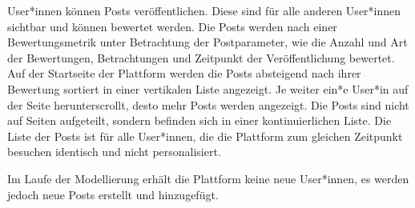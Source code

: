 User*innen können Posts veröffentlichen. Diese sind für alle anderen User*innen sichtbar und können bewertet werden. Die Posts werden nach einer Bewertungsmetrik unter Betrachtung der Postparameter, wie die Anzahl und Art der Bewertungen, Betrachtungen und Zeitpunkt der Veröffentlichung bewertet. Auf der Startseite der Plattform werden die Posts absteigend nach ihrer Bewertung sortiert in einer vertikalen Liste angezeigt. Je weiter ein*e User*in auf der Seite herunterscrollt, desto mehr Posts werden angezeigt. Die Posts sind nicht auf Seiten aufgeteilt, sondern befinden sich in einer kontinuierlichen Liste. Die Liste der Posts ist für alle User*innen, die die Plattform zum gleichen Zeitpunkt besuchen identisch und nicht personalisiert.

Im Laufe der Modellierung erhält die Plattform keine neue User*innen, es werden jedoch neue Posts erstellt und hinzugefügt.

